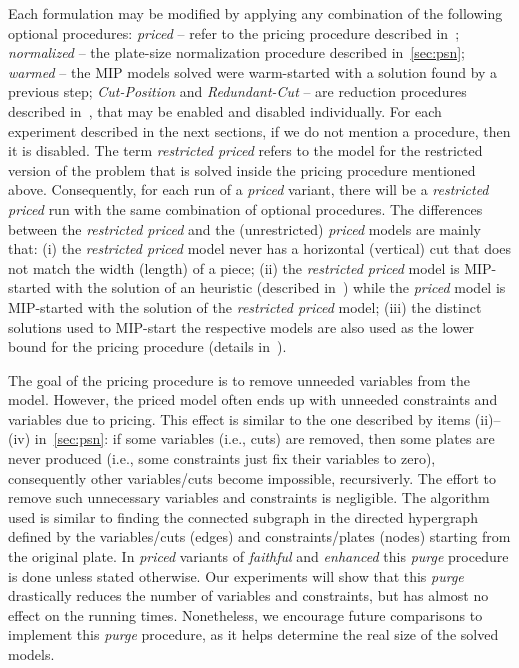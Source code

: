 \documentclass[smallextended]{svjour3}       %
\begin{document}
Each formulation may be modified by applying any combination of the following optional procedures:
\emph{priced} -- refer to the pricing procedure described in~\cite{furini:2016,dimitri_thesis};
\emph{normalized} -- the plate-size normalization procedure described in~\autoref{sec:psn};
\emph{warmed} -- the MIP models solved were warm-started with a solution found by a previous step;
\emph{Cut-Position} and \emph{Redundant-Cut} -- are reduction procedures described in~\cite{furini:2016,dimitri_thesis}, that may be enabled and disabled individually.
For each experiment described in the next sections, if we do not mention a procedure, then it is disabled.
The term \emph{restricted priced} refers to the model for the restricted version of the problem that is solved inside the pricing procedure mentioned above.
Consequently, for each run of a \emph{priced} variant, there will be a \emph{restricted priced} run with the same combination of optional procedures.
The differences between the \emph{restricted priced} and the (unrestricted) \emph{priced} models are mainly that:
(i) the \emph{restricted priced} model never has a horizontal (vertical) cut that does not match the width (length) of a piece;
(ii) the \emph{restricted priced} model is MIP-started with the solution of an heuristic (described in~\cite{furini:2016}) while the \emph{priced} model is MIP-started with the solution of the \emph{restricted priced} model;
(iii) the distinct solutions used to MIP-start the respective models are also used as the lower bound for the pricing procedure (details in~\cite{furini:2016}).

The goal of the pricing procedure is to remove unneeded variables from the model.
However, the priced model often ends up with unneeded constraints and variables due to pricing.
This effect is similar to the one described by items (ii)--(iv) in~\autoref{sec:psn}: if some variables (i.e., cuts) are removed, then some plates are never produced (i.e., some constraints just fix their variables to zero), consequently other variables/cuts become impossible, recursiverly.
The effort to remove such unnecessary variables and constraints is negligible.
The algorithm used is similar to finding the connected subgraph in the directed hypergraph defined by the variables/cuts (edges) and constraints/plates (nodes) starting from the original plate.
In \emph{priced} variants of \emph{faithful} and \emph{enhanced} this \emph{purge} procedure is done unless stated otherwise.
Our experiments will show that this \emph{purge} drastically reduces the number of variables and constraints, but has almost no effect on the running times.
Nonetheless, we encourage future comparisons to implement this \emph{purge} procedure, as it helps determine the real size of the solved models.
\end{document}
